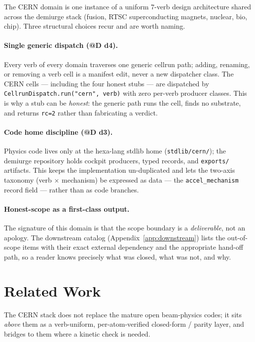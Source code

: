 \documentclass[11pt,a4paper]{article}
\begin{document}
The CERN domain is one instance of a uniform 7-verb design architecture
shared across the demiurge stack (fusion, RTSC superconducting magnets,
nuclear, bio, chip). Three structural choices recur and are worth naming.

\paragraph{Single generic dispatch (@D d4).} Every verb of every domain
traverses one generic cellrun path; adding, renaming, or removing a verb
cell is a manifest edit, never a new dispatcher class. The CERN cells ---
including the four honest stubs --- are dispatched by
\verb|CellrunDispatch.run("cern", verb)| with zero per-verb producer
classes. This is why a stub can be \emph{honest}: the generic path runs
the cell, finds no substrate, and returns \texttt{rc=2} rather than
fabricating a verdict.

\paragraph{Code home discipline (@D d3).} Physics code lives only at the
hexa-lang stdlib home (\verb|stdlib/cern/|); the demiurge repository holds
cockpit producers, typed records, and \verb|exports/| artifacts. This
keeps the implementation un-duplicated and lets the two-axis taxonomy
(verb $\times$ mechanism) be expressed as data --- the
\verb|accel_mechanism| record field --- rather than as code branches.

\paragraph{Honest-scope as a first-class output.} The signature of this
domain is that the scope boundary is a \emph{deliverable}, not an
apology. The downstream catalog (Appendix~\ref{app:downstream}) lists the
out-of-scope items with their exact external dependency and the
appropriate hand-off path, so a reader knows precisely what was closed,
what was not, and why.

\section{Related Work}
\label{sec:related}

The CERN stack does not replace the mature open beam-physics codes; it
sits \emph{above} them as a verb-uniform, per-atom-verified closed-form /
parity layer, and bridges to them where a kinetic check is needed.
\end{document}
